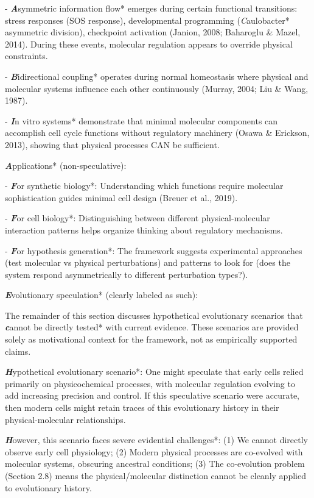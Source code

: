 \documentclass[11pt,a4paper]{article}
\begin{document}
- \textbf\textit*Asymmetric information flow* emerges during certain functional transitions: stress responses (SOS response), developmental programming (\textit*Caulobacter* asymmetric division), checkpoint activation (Janion, 2008; Baharoglu & Mazel, 2014). During these events, molecular regulation appears to override physical constraints.

- \textbf\textit*Bidirectional coupling* operates during normal homeostasis where physical and molecular systems influence each other continuously (Murray, 2004; Liu & Wang, 1987).

- \textbf\textit*In vitro systems* demonstrate that minimal molecular components can accomplish cell cycle functions without regulatory machinery (Osawa & Erickson, 2013), showing that physical processes CAN be sufficient.

\textbf\textit*Applications* (non-speculative):

- \textbf\textit*For synthetic biology*: Understanding which functions require molecular sophistication guides minimal cell design (Breuer et al., 2019).

- \textbf\textit*For cell biology*: Distinguishing between different physical-molecular interaction patterns helps organize thinking about regulatory mechanisms.

- \textbf\textit*For hypothesis generation*: The framework suggests experimental approaches (test molecular vs physical perturbations) and patterns to look for (does the system respond asymmetrically to different perturbation types?).

\textbf\textit*Evolutionary speculation* (clearly labeled as such):

The remainder of this section discusses hypothetical evolutionary scenarios that \textbf\textit*cannot be directly tested* with current evidence. These scenarios are provided solely as motivational context for the framework, not as empirically supported claims.

\textbf\textit*Hypothetical evolutionary scenario*: One might speculate that early cells relied primarily on physicochemical processes, with molecular regulation evolving to add increasing precision and control. If this speculative scenario were accurate, then modern cells might retain traces of this evolutionary history in their physical-molecular relationships.

\textbf\textit*However, this scenario faces severe evidential challenges*: (1) We cannot directly observe early cell physiology; (2) Modern physical processes are co-evolved with molecular systems, obscuring ancestral conditions; (3) The co-evolution problem (Section 2.8) means the physical/molecular distinction cannot be cleanly applied to evolutionary history.
\end{document}
